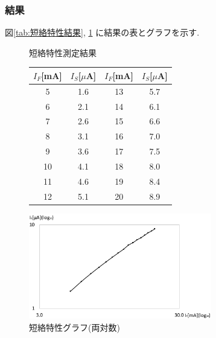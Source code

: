 \documentclass[titlepage]{jsarticle}
\begin{document}
        \subsubsection{結果}
            図\ref{tab:短絡特性結果}, \ref{fig:短絡特性グラフ}
            に結果の表とグラフを示す.

            \begin{figure}[ht]
                \def\@captype{table}
                \begin{minipage}{0.5\hsize}
                    \begin{center}
                        \caption{短絡特性測定結果}
                        \label{tab:短絡特性結果}
                        \begin{tabular}{c|c||c|c}
                            $I_F$[mA] & $I_S$[$\mu$A] & $I_F$[mA] & $I_S$[$\mu$A] \\ \hline
                            5 & 1.6 & 13 & 5.7 \\
                            6 & 2.1 & 14 & 6.1 \\
                            7 & 2.6 & 15 & 6.6 \\
                            8 & 3.1 & 16 & 7.0 \\
                            9 & 3.6 & 17 & 7.5 \\
                            10 & 4.1 & 18 & 8.0 \\
                            11 & 4.6 & 19 & 8.4 \\
                            12 & 5.1 & 20 & 8.9
                        \end{tabular}
                    \end{center}
                \end{minipage}
                \begin{minipage}{0.5\hsize}
                    \begin{center}
                        \includegraphics[width=8cm]{graphs/tanraku.pdf}
                        \caption{短絡特性グラフ(両対数)}
                        \label{fig:短絡特性グラフ}
                    \end{center}
                \end{minipage}
            \end{figure}
\end{document}
